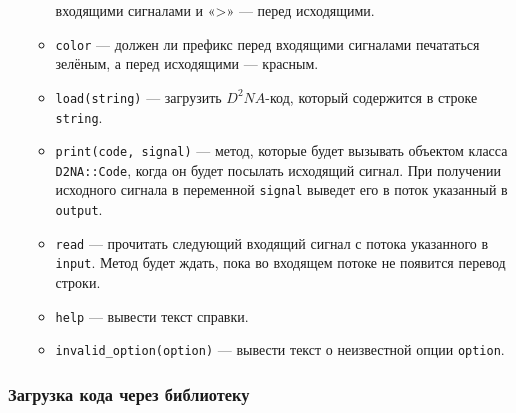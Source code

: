 \documentclass[utf8,a5paper,portrait,10pt,twoside]{eskdtext}
\begin{document}
\begin{itemize}
\begin{itemize}
                входящими сигналами и «>» — перед исходящими.
          \item \texttt{color} — должен ли префикс перед входящими сигналами
                печататься зелёным, а перед исходящими — красным.
          \item \texttt{load(string)} — загрузить $D^2NA$-код, который
                содержится в строке \texttt{string}.
          \item \texttt{print(code, signal)} — метод, которые будет вызывать
                объектом класса \texttt{D2NA::Code}, когда он будет посылать
                исходящий сигнал. При получении исходного сигнала в переменной
                \texttt{signal} выведет его в поток указанный в \texttt{output}.
          \item \texttt{read} — прочитать следующий входящий сигнал с потока
                указанного в \texttt{input}. Метод будет ждать, пока во
                входящем потоке не появится перевод строки.
          \item \texttt{help} — вывести текст справки.
          \item \texttt{invalid\_option(option)} — вывести текст о неизвестной
                опции \texttt{option}.
        \end{itemize}
\end{itemize}

\subsubsection{Загрузка кода через библиотеку}
\end{document}
